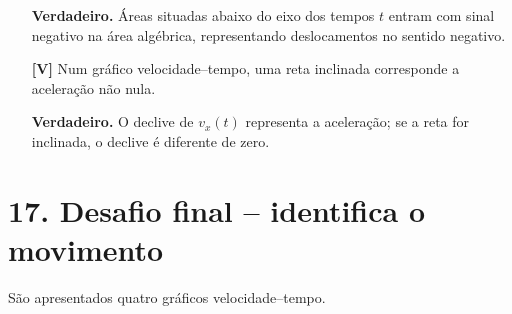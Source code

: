 \documentclass[11pt,a4paper]{article}
\begin{document}
\begin{enumerate}[label=\textbf{\arabic*.},resume]
		\begin{solucao}
			\textbf{Verdadeiro.} Áreas situadas abaixo do eixo dos tempos $t$ entram com sinal negativo na área algébrica, representando deslocamentos no sentido negativo.
		\end{solucao}
		
		\item[\textbf{[V]}]
		Num gráfico velocidade--tempo, uma reta inclinada corresponde a aceleração
		não nula.
		
		\begin{solucao}
			\textbf{Verdadeiro.} O declive de $v_x(t)$ representa a aceleração; se a reta for inclinada, o declive é diferente de zero.
		\end{solucao}
		
	\end{enumerate}
	
	\section*{17. Desafio final -- identifica o movimento}
	
	São apresentados quatro gráficos velocidade--tempo.
	
\end{document}
